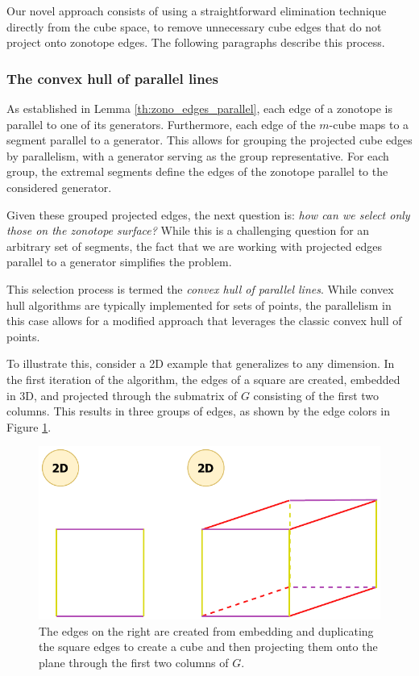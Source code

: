 Our novel approach consists of using a straightforward elimination technique directly from the cube space, to remove unnecessary cube edges that do not project onto zonotope edges. The following paragraphs describe this process.

\subsubsection*{The convex hull of parallel lines}
As established in Lemma \ref{th:zono_edges_parallel}, each edge of a zonotope is parallel to one of its generators. Furthermore, each edge of the $m$-cube maps to a segment parallel to a generator. This allows for grouping the projected cube edges by parallelism, with a generator serving as the group representative. For each group, the extremal segments define the edges of the zonotope parallel to the considered generator.

Given these grouped projected edges, the next question is: \emph{how can we select only those on the zonotope surface?} While this is a challenging question for an arbitrary set of segments, the fact that we are working with projected edges parallel to a generator simplifies the problem.

This selection process is termed the \emph{convex hull of parallel lines}.  While convex hull algorithms are typically implemented for sets of points, the parallelism in this case allows for a modified approach that leverages the classic convex hull of points.

To illustrate this, consider a 2D example that generalizes to any dimension.  In the first iteration of the algorithm, the edges of a square are created, embedded in 3D, and projected through the submatrix of $G$ consisting of the first two columns. This results in three groups of edges, as shown by the edge colors in Figure \ref{fig:convex_hull_lines_intro}.

\begin{figure}[!htb]
  \captionsetup{justification=centering}
  
  \centering
  \includegraphics[trim={0 0 0 0},clip,width=0.5\linewidth]{img/chapter_2/zonotope_convex_hull_lines_intro.pdf}

  \caption{The edges on the right are created from embedding and duplicating the square edges to create a cube and then projecting them onto the plane through the first two columns of $G$.}
  \label{fig:convex_hull_lines_intro}
\end{figure}

